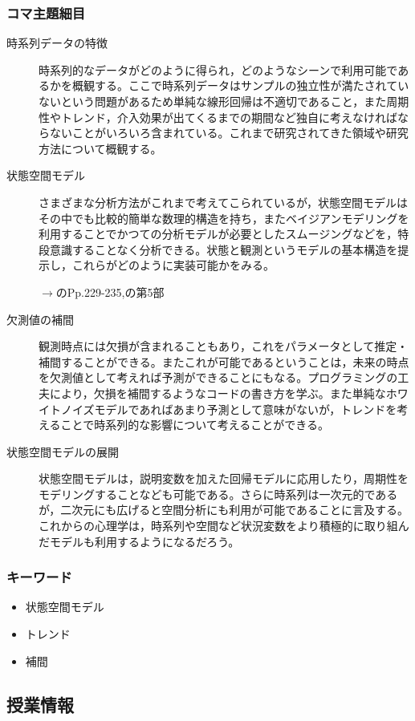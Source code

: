 \subsubsection{コマ主題細目}
\begin{description}
	\item[時系列データの特徴] 時系列的なデータがどのように得られ，どのようなシーンで利用可能であるかを概観する。ここで時系列データはサンプルの独立性が満たされていないという問題があるため単純な線形回帰は不適切であること，また周期性やトレンド，介入効果が出てくるまでの期間など独自に考えなければならないことがいろいろ含まれている。これまで研究されてきた領域や研究方法について概観する。
	\item[状態空間モデル] さまざまな分析方法がこれまで考えてこられているが，状態空間モデルはその中でも比較的簡単な数理的構造を持ち，またベイジアンモデリングを利用することでかつての分析モデルが必要としたスムージングなどを，特段意識することなく分析できる。状態と観測というモデルの基本構造を提示し，これらがどのように実装可能かをみる。
	      \begin{flushright}
		      $\to$\textcite{Matsuura201610}のPp.229-235,\textcite{Baba201907}の第5部
	      \end{flushright}
	\item[欠測値の補間] 観測時点には欠損が含まれることもあり，これをパラメータとして推定・補間することができる。またこれが可能であるということは，未来の時点を欠測値として考えれば予測ができることにもなる。プログラミングの工夫により，欠損を補間するようなコードの書き方を学ぶ。また単純なホワイトノイズモデルであればあまり予測として意味がないが，トレンドを考えることで時系列的な影響について考えることができる。
	\item[状態空間モデルの展開] 状態空間モデルは，説明変数を加えた回帰モデルに応用したり，周期性をモデリングすることなども可能である。さらに時系列は一次元的であるが，二次元にも広げると空間分析にも利用が可能であることに言及する。これからの心理学は，時系列や空間など状況変数をより積極的に取り組んだモデルも利用するようになるだろう。
\end{description}
\subsubsection{キーワード}
\begin{itemize}
	\item 状態空間モデル
	\item トレンド
	\item 補間
\end{itemize}
\subsection{授業情報}
